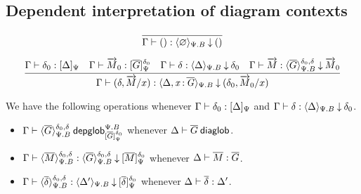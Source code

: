 \subsection{Dependent interpretation of diagram contexts}

\[\infer
  {\ofinterpdep{\Gamma}{()}{\emptyctx}{\Psi.B}{()}}
  {}
\]

\[
\infer
  {\ofinterpdep{\Gamma}{(\delta,\tel M/x)}
   {\Delta,\tptm{x}{\diag G}}{\Psi.B}{(\delta_0,\tel M_0/x)}}
  {\ofinterp{\Gamma}{\delta_0}{\Delta}{\Psi}
  & \ofglob{\Gamma}{\tel M_0}{\interpglob{\diag G}{\Psi}{\delta_0}}
  & \ofinterpdep{\Gamma}{\delta}{\Delta}{\Psi.B}{\delta_0}
  & \ofdepglob{\Gamma}{\tel M}{\interpdepglob{\diag G}{\Psi.B}{\delta_0}{\delta}}{\tel M_0}}
\]

We have the following operations whenever
${\Gamma} \vdash {\delta_0} : {[ \Delta ]_{\Psi}}$ and
${\Gamma} \vdash {\delta} : {\langle \Delta \rangle_{\Psi.B}}\mathbin{\downarrow}{\delta_0}$.

\begin{itemize}
\item
${\Gamma} \vdash {\langle {\ensuremath{\overline{G}}}\rangle_{\Psi.B}^{\delta_0,\delta}} \: \mathsf{depglob}^{\Psi.B}_{[{\overline{G}}]_{\Psi}^{\delta_0}}$
whenever
${\Delta} \vdash {\ensuremath{\overline{G}}} \: \mathsf{diaglob}$.

\item
${\Gamma} \vdash {\langle {\ensuremath{\overline{M}}}\rangle_{\Psi.B}^{\delta_0,\delta}} : {\langle {\ensuremath{\overline{G}}}\rangle_{\Psi.B}^{\delta_0,\delta}}\mathbin{\downarrow}{[{\overline{M}}]_{\Psi}^{\delta_0}}$
whenever
${\Delta} \vdash {\ensuremath{\overline{M}}} : {\overline{G}}$.

\item
${\Gamma} \vdash {\langle {\ensuremath{\overline{\delta}}}\rangle_{\Psi.B}^{\delta_0,\delta}} : {\langle \Delta' \rangle_{\Psi.B}}\mathbin{\downarrow}{[{\overline{\delta}}]_{\Psi}^{\delta_0}}$
whenever
${\Delta} \vdash {\ensuremath{\overline{\delta}}} : {\Delta'}$.
\end{itemize}

